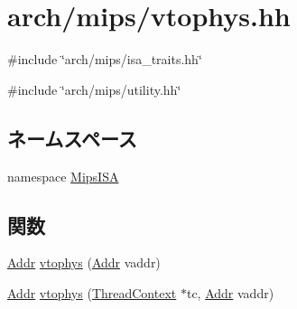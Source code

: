 \hypertarget{mips_2vtophys_8hh}{
\section{arch/mips/vtophys.hh}
\label{mips_2vtophys_8hh}
}
{\ttfamily \#include \char`\"{}arch/mips/isa\_\-traits.hh\char`\"{}}\par
{\ttfamily \#include \char`\"{}arch/mips/utility.hh\char`\"{}}\par
\subsection*{ネームスペース}
\begin{DoxyCompactItemize}
\item 
namespace \hyperlink{namespaceMipsISA}{MipsISA}
\end{DoxyCompactItemize}
\subsection*{関数}
\begin{DoxyCompactItemize}
\item 
\hyperlink{classm5_1_1params_1_1Addr}{Addr} \hyperlink{namespaceMipsISA_a3828815371ad2b0a1be60abdcb405cf9}{vtophys} (\hyperlink{classm5_1_1params_1_1Addr}{Addr} vaddr)
\item 
\hyperlink{classm5_1_1params_1_1Addr}{Addr} \hyperlink{namespaceMipsISA_ad4bbbca3210dee66152520984c3aac6a}{vtophys} (\hyperlink{classThreadContext}{ThreadContext} $\ast$tc, \hyperlink{classm5_1_1params_1_1Addr}{Addr} vaddr)
\end{DoxyCompactItemize}
